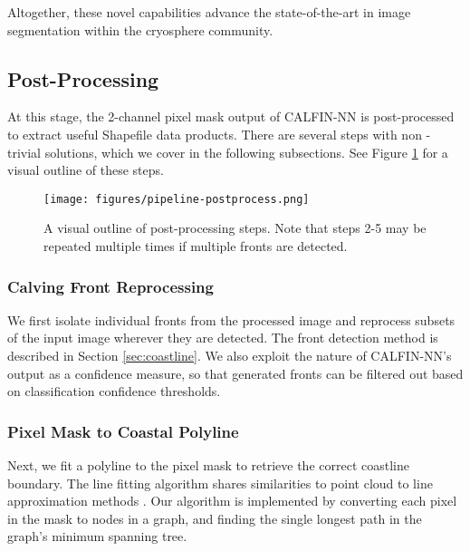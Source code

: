 \documentclass[tc, manuscript]{copernicus}
\begin{document}
Altogether, these novel capabilities advance the state-of-the-art in image segmentation within the cryosphere community.

\subsection{Post-Processing}
\label{sec:postproc}
At this stage, the 2-channel pixel mask output of CALFIN-NN is post-processed to extract useful Shapefile data products. There are several steps with non -trivial solutions, which we cover in the following subsections. See Figure \ref{fig:postproc} for a visual outline of these steps.

\begin{figure}[h]
    \texttt{[image: figures/pipeline-postprocess.png]}
    \centering
    \caption{A visual outline of post-processing steps. Note that steps 2-5 may be repeated multiple times if multiple fronts are detected.}
    \label{fig:postproc}
\end{figure}

\subsubsection{Calving Front Reprocessing}
\label{sec:reproc}
We first isolate individual fronts from the processed image and reprocess subsets of the input image wherever they are detected. The front detection method is described in Section \ref{sec:coastline}. We also exploit the nature of CALFIN-NN's output as a confidence measure, so that generated fronts can be filtered out based on classification confidence thresholds.

\subsubsection{Pixel Mask to Coastal Polyline}
\label{sec:pixel_mask}
Next, we fit a polyline to the pixel mask to retrieve the correct coastline boundary. The line fitting algorithm shares similarities to point cloud to line approximation methods \citep{zolnieruk2016}. Our algorithm is implemented by converting each pixel in the mask to nodes in a graph, and finding the single longest path in the graph's minimum spanning tree.
\end{document}

